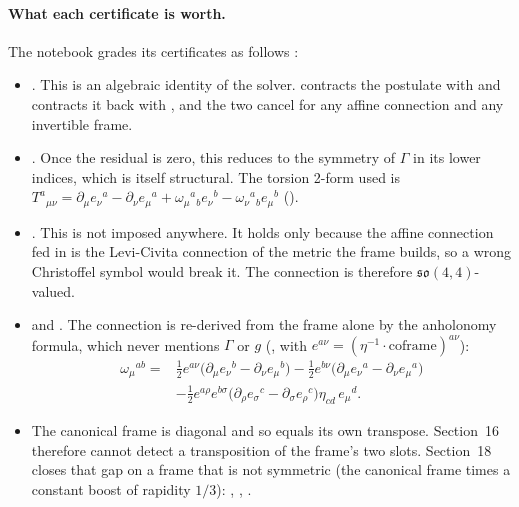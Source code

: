 \paragraph{What each certificate is worth.} The notebook grades its certificates as follows
:
\begin{itemize}
  \item {} .
    This is an algebraic identity of the solver.  contracts the postulate
    with  and  contracts it back with
    , and the two cancel for any affine connection and any invertible frame.
  \item {} . Once the residual is
    zero, this reduces to the symmetry of $\Gamma$ in its lower indices, which is itself
    structural. The torsion 2-form used is
    $T^a{}_{\mu\nu}=\partial_\mu e_\nu{}^a-\partial_\nu e_\mu{}^a+\omega_\mu{}^a{}_b e_\nu{}^b-\omega_\nu{}^a{}_b e_\mu{}^b$
    ().
  \item {} .
    This is not imposed anywhere. It holds only because the affine connection fed in is the
    Levi-Civita connection of the metric the frame builds, so a wrong Christoffel symbol would
    break it. The connection is therefore $\mathfrak{so}(4,4)$-valued.
  \item {} 
    and . The
    connection is re-derived from the frame alone by the anholonomy formula, which never mentions
    $\Gamma$ or $g$ (, with $e^{a\nu}=(\eta^{-1}\cdot\text{coframe})^{a\nu}$):
    \begin{equation}
    \begin{aligned}
      \omega_\mu{}^{ab}={}&\tfrac12 e^{a\nu}\bigl(\partial_\mu e_\nu{}^b-\partial_\nu e_\mu{}^b\bigr)
       -\tfrac12 e^{b\nu}\bigl(\partial_\mu e_\nu{}^a-\partial_\nu e_\mu{}^a\bigr)\\
       &-\tfrac12 e^{a\rho}e^{b\sigma}\bigl(\partial_\rho e_\sigma{}^c-\partial_\sigma e_\rho{}^c\bigr)\eta_{cd}\,e_\mu{}^d .
    \end{aligned}
    \end{equation}
  \item The canonical frame is diagonal and so equals its own transpose. Section~16 therefore
    cannot detect a transposition of the frame's two slots. Section~18 closes that gap on a frame
    that is not symmetric (the canonical frame times a constant boost of rapidity $1/3$):
     ,
    ,
    .
\end{itemize}

